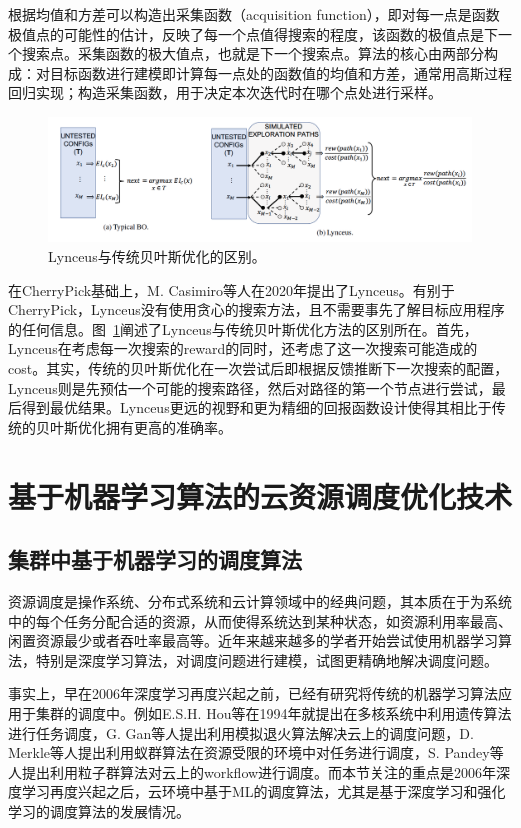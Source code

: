 根据均值和方差可以构造出采集函数（acquisition function），即对每一点是函数极值点的可能性的估计，反映了每一个点值得搜索的程度，该函数的极值点是下一个搜索点。采集函数的极大值点，也就是下一个搜索点。算法的核心由两部分构成：对目标函数进行建模即计算每一点处的函数值的均值和方差，通常用高斯过程回归实现；构造采集函数，用于决定本次迭代时在哪个点处进行采样。

\begin{figure}[h]
    \centerline{\includegraphics[width=\textwidth]{figures/lynceus-arch.png}}
    \caption{Lynceus与传统贝叶斯优化的区别。}
    \label{lynceus_arch}
\end{figure}

在CherryPick基础上，M. Casimiro等人在2020年提出了Lynceus\parencite{casimiro2019lynceus}。有别于CherryPick，Lynceus没有使用贪心的搜索方法，且不需要事先了解目标应用程序的任何信息。图~\ref{lynceus_arch}阐述了Lynceus与传统贝叶斯优化方法的区别所在。首先，Lynceus在考虑每一次搜索的reward的同时，还考虑了这一次搜索可能造成的cost。其实，传统的贝叶斯优化在一次尝试后即根据反馈推断下一次搜索的配置，Lynceus则是先预估一个可能的搜索路径，然后对路径的第一个节点进行尝试，最后得到最优结果。Lynceus更远的视野和更为精细的回报函数设计使得其相比于传统的贝叶斯优化拥有更高的准确率。

\section{基于机器学习算法的云资源调度优化技术}

\subsection{集群中基于机器学习的调度算法}
资源调度是操作系统、分布式系统和云计算领域中的经典问题，其本质在于为系统中的每个任务分配合适的资源，从而使得系统达到某种状态，如资源利用率最高、闲置资源最少或者吞吐率最高等。近年来越来越多的学者开始尝试使用机器学习算法，特别是深度学习算法，对调度问题进行建模，试图更精确地解决调度问题。

事实上，早在2006年深度学习再度兴起之前，已经有研究将传统的机器学习算法应用于集群的调度中。例如E.S.H. Hou等\parencite{265940}在1994年就提出在多核系统中利用遗传算法进行任务调度，G. Gan等人\parencite{5655013}提出利用模拟退火算法解决云上的调度问题，D. Merkle等人\parencite{1027745}提出利用蚁群算法在资源受限的环境中对任务进行调度，S. Pandey等人\parencite{5474725}提出利用粒子群算法对云上的workflow进行调度。而本节关注的重点是2006年深度学习再度兴起之后，云环境中基于ML的调度算法，尤其是基于深度学习和强化学习的调度算法的发展情况。

